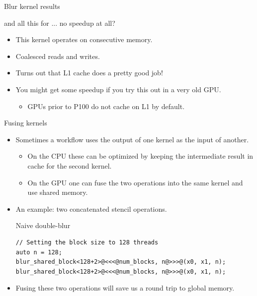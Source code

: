\documentclass[aspectratio=43]{beamer}
\begin{document}
\begin{frame}[fragile]{Blur kernel results}

    \begin{info}{and all this for ... no speedup at all?}
        \begin{itemize}
            \item This kernel operates on consecutive memory.
            \item Coalesced reads and writes.
            \item Turns out that L1 cache does a pretty good job!
            \item You might get some speedup if you try this out in a very old GPU.
            \begin{itemize}
                \item GPUs prior to P100 do not cache on L1 by default.
            \end{itemize}
        \end{itemize}
    \end{info}

\end{frame}

\begin{frame}[fragile]{Fusing kernels}
    \begin{itemize}
        \item Sometimes a workflow uses the output of one kernel as the input of another.
        \begin{itemize}
            \item On the CPU these can be optimized by keeping the intermediate result in cache for the second kernel.
            \item On the GPU one can fuse the two operations into the same kernel and use shared memory.
        \end{itemize}
        \item An example: two concatenated stencil operations.
    \begin{code}{Naive double-blur}
        \begin{lstlisting}[style=boxcudatiny]
// Setting the block size to 128 threads
auto n = 128;
blur_shared_block<128+2>@<<<@num_blocks, n@>>>@(x0, x1, n);
blur_shared_block<128+2>@<<<@num_blocks, n@>>>@(x0, x1, n);
        \end{lstlisting}
    \end{code}
        \item Fusing these two operations will save us a round trip to global memory.
    \end{itemize}
\end{frame}
\end{document}
